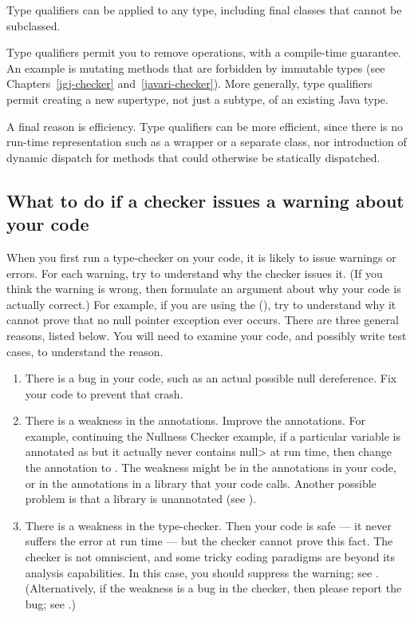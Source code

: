 Type qualifiers can be applied to any type, including final classes that
cannot be subclassed.

Type qualifiers permit you to remove operations, with a compile-time
guarantee.  An example is mutating methods that are forbidden by immutable
types (see Chapters~\ref{igj-checker} and~\ref{javari-checker}).  More
generally, type qualifiers permit creating a new supertype, not just a
subtype, of an existing Java type.

A final reason is efficiency.  Type qualifiers can be more
efficient, since there is no run-time representation such as a wrapper
or a separate class, nor introduction of dynamic dispatch for methods that
could otherwise be statically dispatched.


\subsection{What to do if a checker issues a warning about your code\label{handling-warnings}}

When you first run a type-checker on your code, it is likely to issue
warnings or errors.  For each warning, try to understand why the checker
issues it.  (If you think the warning is wrong, then formulate an argument
about why your code is actually correct.)  For example, if you are using the
(), try to understand why it cannot prove
that no null pointer exception ever occurs.  There are three general
reasons, listed below.  You will need to
examine your code, and possibly write test cases, to understand the reason.

\begin{enumerate}
\item
There is a bug in your code, such as an actual possible null dereference.
Fix your code to prevent that crash.

\item
There is a weakness in the annotations.  Improve the annotations.
For example, continuing the Nullness Checker example, if a particular
variable is annotated as  but it
actually never contains \<null> at run time, then change the annotation to 
.  The weakness might be in the
annotations in your code, or in the annotations in a library that your code
calls.  Another possible problem is that a library is unannotated (see
).

\item
There is a weakness in the type-checker.  Then your code is safe --- it never
suffers the error at run time --- but the checker cannot prove this
fact.  The checker is not omniscient, and some
tricky coding paradigms are beyond its analysis capabilities.  In this
case, you should suppress the warning; see
.  (Alternatively, if the weakness is
a bug in the checker, then  please report the bug; see
.)
\end{enumerate}

